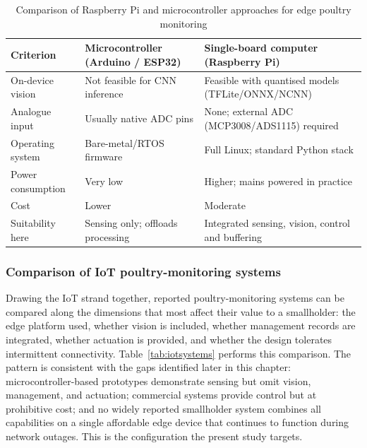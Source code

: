 \documentclass[12pt,a4paper]{report}
\begin{document}
\begin{table}[tbp]
\caption{Comparison of Raspberry Pi and microcontroller approaches for edge poultry monitoring}
\label{tab:edge}
\centering
\small
\begin{tabularx}{\textwidth}{|l|X|X|}
\hline
\rowcolor{headerblue}
\textbf{Criterion} & \textbf{Microcontroller (Arduino / ESP32)} & \textbf{Single-board computer (Raspberry Pi)} \\
\hline
On-device vision & Not feasible for CNN inference & Feasible with quantised models (TFLite/ONNX/NCNN) \\
\hline
Analogue input & Usually native ADC pins & None; external ADC (MCP3008/ADS1115) required \\
\hline
Operating system & Bare-metal/RTOS firmware & Full Linux; standard Python stack \\
\hline
Power consumption & Very low & Higher; mains powered in practice \\
\hline
Cost & Lower & Moderate \\
\hline
Suitability here & Sensing only; offloads processing & Integrated sensing, vision, control and buffering \\
\hline
\end{tabularx}
\end{table}

\subsubsection*{Comparison of IoT poultry-monitoring systems}

Drawing the IoT strand together, reported poultry-monitoring systems can be compared along the dimensions that most affect their value to a smallholder: the edge platform used, whether vision is included, whether management records are integrated, whether actuation is provided, and whether the design tolerates intermittent connectivity. Table~\ref{tab:iotsystems} performs this comparison. The pattern is consistent with the gaps identified later in this chapter: microcontroller-based prototypes demonstrate sensing but omit vision, management, and actuation; commercial systems provide control but at prohibitive cost; and no widely reported smallholder system combines all capabilities on a single affordable edge device that continues to function during network outages. This is the configuration the present study targets.
\end{document}
